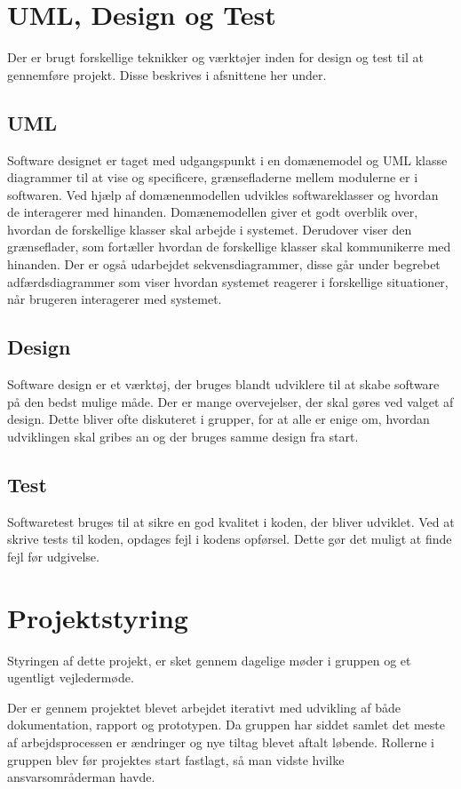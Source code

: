 \section{UML, Design og Test}
Der er brugt forskellige teknikker og værktøjer inden for design og test til at gennemføre projekt. Disse beskrives i afsnittene her under.
\subsection{UML}
Software designet er taget med udgangspunkt i en domænemodel og UML\cite{UML} klasse diagrammer til at vise og specificere, grænsefladerne mellem modulerne er i softwaren.
Ved hjælp af domænenmodellen udvikles softwareklasser og hvordan de interagerer med hinanden.
Domænemodellen giver et godt overblik over, hvordan de forskellige klasser skal arbejde i systemet. Derudover viser den grænseflader, som fortæller hvordan de forskellige klasser skal kommunikerre med hinanden.
Der er også udarbejdet sekvensdiagrammer, disse går under begrebet adfærdsdiagrammer som viser hvordan systemet reagerer i forskellige situationer, når brugeren interagerer med systemet.

\subsection{Design}
Software design er et værktøj, der bruges blandt udviklere til at skabe software på den bedst mulige måde. Der er mange overvejelser, der skal gøres ved valget af design. Dette bliver ofte diskuteret i grupper, for at alle er enige om, hvordan udviklingen skal gribes an og der bruges samme design fra start.

\subsection{Test}
Softwaretest bruges til at sikre en god kvalitet i koden, der bliver udviklet. Ved at skrive tests til koden, opdages fejl i kodens opførsel. Dette gør det muligt at finde fejl før udgivelse.
\newline

\section{Projektstyring}
Styringen af dette projekt, er sket gennem dagelige møder i gruppen og et ugentligt vejledermøde.
 
Der er gennem projektet blevet arbejdet iterativt med udvikling af både dokumentation, rapport og prototypen. Da gruppen har siddet samlet det meste af arbejdsprocessen er ændringer og nye tiltag blevet aftalt løbende.
Rollerne i gruppen blev før projektes start fastlagt, så man vidste hvilke ansvarsområderman havde.

